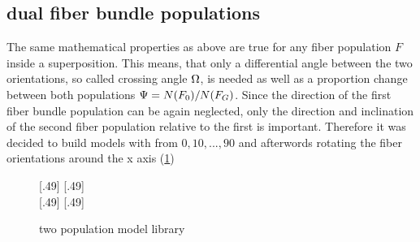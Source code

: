 \subsection{dual fiber bundle populations}
The same mathematical properties as above are true for any fiber population $F$ inside a superposition.
This means, that only a differential angle between the two orientations, so called crossing angle $\textnormal{$\Omega$}$, is needed as well as a proportion change between both populations $\textnormal{$\Psi$}{} = N(F_0)/N(F_G)$.
% 
Since the direction of the first fiber bundle population can be again neglected, only the direction and inclination of the second fiber population relative to the first is important. Therefore it was decided to build models with \modelOmega{} from ${0,10,...,90}$ and afterwords rotating the fiber orientations around the x axis (\cref{fig:twomodelpop})
% 
% 
\begin{figure}[p]
\centering
\def\tikzwidth{0.45*\textwidth}
[.49\textwidth]{}\hfill
{}
[.49\textwidth]{}
% 
\\
% 
[.49\textwidth]{}\hfill
{}
[.49\textwidth]{}
\caption{two population model library}
\label{fig:twomodelpop}
\end{figure}
%  
% 
